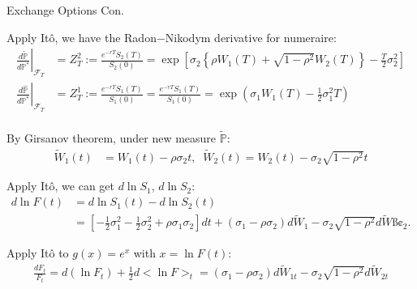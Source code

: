 \documentclass{beamer}
\begin{document}
\begin{frame}{Exchange Options Con.}

    {\footnotesize \footnotesize
    \par Apply Itô, we have the Radon$-$Nikodym derivative for numeraire:
    \begin{align*}
        \left.\frac{d\tilde{\mathbb{P}}}{d\mathbb{P}^*}\right|_{\mathcal{F}_T}& = Z_T^2 := \frac{e^{-rT} S_2(T)}{S_2(0)} = \exp \left[ \sigma_2 
        \left\{ \rho W_1(T) + \sqrt{1 - \rho^2} W_2(T) \right\} - \frac{T}{2} \sigma_2^2 \right]\\
        \left.\frac{d\hat{\mathbb{P}}}{d\mathbb{P}^*}\right|_{\mathcal{F}_T}& = Z_T^1 := \frac{e^{-rT} S_1(T)}{S_1(0)} 
        =\frac{e^{-rT}S_1(T)}{S_1(0)} = \exp\left(\sigma_1 W_1(T) - \frac{1}{2}\sigma_1^2 T\right)\\
    \end{align*}

    \vspace{-2em}
    \par By Girsanov theorem, under new measure $\tilde{\mathbb{P}}$:
    \begin{align*}
        \tilde{W}_1(t) &= W_1(t) - \rho\sigma_2 t, \;\; \tilde{W}_2(t) = W_2(t) - \sigma_2\sqrt{1-\rho^2} t
    \end{align*}
    \par Apply Itô, we can get $d\ln S_1$, $d\ln S_2$:
    \begin{align*}
        d \ln F(t) &= d \ln S_1(t) - d \ln S_2(t) \\
        &= \left[  - \tfrac{1}{2}\sigma_1^2  - \tfrac{1}{2}\sigma_2^2 + \rho \sigma_1 \sigma_2 \right] dt 
        + (\sigma_1 - \rho \sigma_2) d\tilde{W}_1 - \sigma_2 \sqrt{1-\rho^2} d\tilde{W}ß¢_2.
    \end{align*}
    \par Apply Itô to $g(x) = e^x$ with $x = \ln F(t)$:
    \begin{align*}
        \frac{dF_t}{F_t} = d(\ln F_t) + \frac{1}{2} d<\ln F>_t 
        = (\sigma_1 - \rho\sigma_2) d\tilde{W}_{1t} - \sigma_2 \sqrt{1 - \rho^2} d\tilde{W}_{2t}
    \end{align*}
    }
\end{frame}
\end{document}
